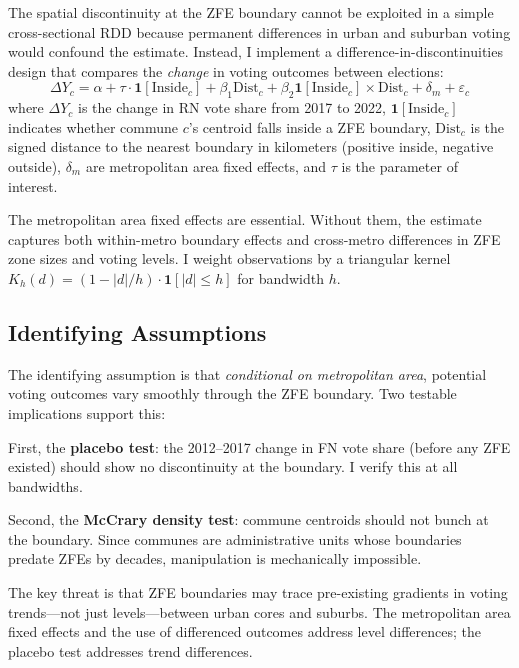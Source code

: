\documentclass[12pt]{article}
\begin{document}
The spatial discontinuity at the ZFE boundary cannot be exploited in a simple cross-sectional RDD because permanent differences in urban and suburban voting would confound the estimate. Instead, I implement a difference-in-discontinuities design \citep{grembi2016discontinuities} that compares the \textit{change} in voting outcomes between elections:
\begin{equation}
\Delta Y_{c} = \alpha + \tau \cdot \mathbf{1}[\text{Inside}_{c}] + \beta_1 \text{Dist}_{c} + \beta_2 \mathbf{1}[\text{Inside}_{c}] \times \text{Dist}_{c} + \delta_{m} + \varepsilon_{c}
\label{eq:main}
\end{equation}
where $\Delta Y_{c}$ is the change in RN vote share from 2017 to 2022, $\mathbf{1}[\text{Inside}_{c}]$ indicates whether commune $c$'s centroid falls inside a ZFE boundary, $\text{Dist}_{c}$ is the signed distance to the nearest boundary in kilometers (positive inside, negative outside), $\delta_m$ are metropolitan area fixed effects, and $\tau$ is the parameter of interest.

The metropolitan area fixed effects are essential. Without them, the estimate captures both within-metro boundary effects and cross-metro differences in ZFE zone sizes and voting levels. I weight observations by a triangular kernel $K_h(d) = (1 - |d|/h) \cdot \mathbf{1}[|d| \leq h]$ for bandwidth $h$.

\subsection{Identifying Assumptions}

The identifying assumption is that \textit{conditional on metropolitan area}, potential voting outcomes vary smoothly through the ZFE boundary. Two testable implications support this:

First, the \textbf{placebo test}: the 2012--2017 change in FN vote share (before any ZFE existed) should show no discontinuity at the boundary. I verify this at all bandwidths.

Second, the \textbf{McCrary density test}: commune centroids should not bunch at the boundary. Since communes are administrative units whose boundaries predate ZFEs by decades, manipulation is mechanically impossible.

The key threat is that ZFE boundaries may trace pre-existing gradients in voting trends---not just levels---between urban cores and suburbs. The metropolitan area fixed effects and the use of differenced outcomes address level differences; the placebo test addresses trend differences.
\end{document}
